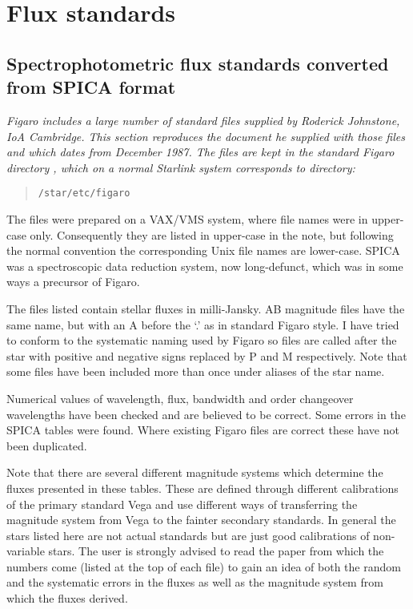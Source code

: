 \newpage %
\section{Flux standards}


\subsection{\label{standard1}Spectrophotometric flux standards converted from SPICA format}

{\em
   Figaro includes a large number of standard files supplied by Roderick
   Johnstone, IoA Cambridge.  This section reproduces the document he
   supplied with those files and which dates from December 1987.  The
   files are kept in the standard Figaro directory 
{,}
   which on a normal Starlink system corresponds to directory:

  \begin{quote}
   {\tt /star/etc/figaro}
  \end{quote}

   The files were prepared on a VAX/VMS system, where file names were
   in upper-case only.  Consequently they are listed in upper-case in the
   note, but following the normal convention the corresponding Unix file
   names are lower-case.  SPICA was a spectroscopic data reduction system,
   now long-defunct, which was in some ways a precursor of Figaro.
\/}

   The files listed contain stellar fluxes in milli-Jansky. AB
   magnitude files have the same name, but with an A before the `.' as
   in standard Figaro style. I have tried to conform to the systematic
   naming used by Figaro so files are called after the star with
   positive and negative signs replaced by P and M respectively. Note
   that some files have been included more than once under aliases of
   the star name.

   Numerical values of wavelength, flux, bandwidth and order changeover
   wavelengths have been checked and are believed to be correct. Some
   errors in the SPICA tables were found. Where existing Figaro files
   are correct these have not been duplicated.

   Note that there are several different magnitude systems which
   determine the fluxes presented in these tables. These are defined
   through different calibrations of the primary standard Vega and use
   different ways of transferring the magnitude system from Vega to the
   fainter secondary standards. In general the stars listed here are not
   actual standards but are just good calibrations of non-variable
   stars. The user is strongly advised to read the paper from which the
   numbers come (listed at the top of each file) to gain an idea of both
   the random and the systematic errors in the fluxes as well as the
   magnitude system from which the fluxes derived.

